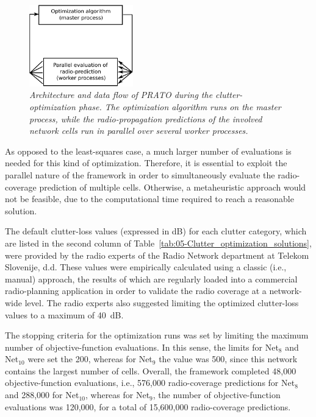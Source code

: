 \begin{figure}
\centering

\includegraphics[width=0.4\textwidth]{05-framework_parameter_tuning/img/architecture}

\caption{\textit{\emph{Architecture and data flow of PRATO during the clutter-optimization
phase. The optimization algorithm runs on the master process, while
the radio-propagation predictions of the involved network cells run
in parallel over several worker processes. \label{fig:05-PRATO_architecture_optimization}}}}
\end{figure}


As opposed to the least-squares case, a much larger number of evaluations
is needed for this kind of optimization. Therefore, it is essential
to exploit the parallel nature of the framework in order to simultaneously
evaluate the radio-coverage prediction of multiple cells. Otherwise,
a metaheuristic approach would not be feasible, due to the computational
time required to reach a reasonable solution.

The default clutter-loss values (expressed in dB) for each clutter
category, which are listed in the second column of Table~\ref{tab:05-Clutter_optimization_solutions},
were provided by the radio experts of the Radio Network department
at Telekom Slovenije, d.d. These values were empirically calculated
using a classic (i.e., manual) approach, the results of which are
regularly loaded into a commercial radio-planning application in order
to validate the radio coverage at a network-wide level. The radio
experts also suggested limiting the optimized clutter-loss values
to a maximum of 40~dB.

The stopping criteria for the optimization runs was set by limiting
the maximum number of objective-function evaluations. In this sense,
the limits for Net$_{8}$ and Net$_{10}$ were set the 200, whereas
for Net$_{9}$ the value was 500, since this network contains the
largest number of cells. Overall, the framework completed 48,000 objective-function
evaluations, i.e., 576,000 radio-coverage predictions for Net$_{8}$
and 288,000 for Net$_{10}$, whereas for Net$_{9}$, the number of
objective-function evaluations was 120,000, for a total of 15,600,000
radio-coverage predictions.

